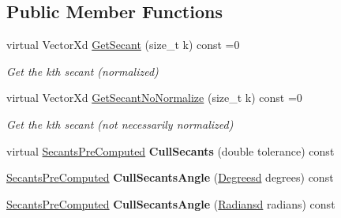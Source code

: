 \subsection*{Public Member Functions}
\begin{DoxyCompactItemize}
\item 
\hypertarget{struct_d_r_d_s_p_1_1_secants_aa36f3ff75b75d498e585cbac447cede9}{virtual Vector\-Xd \hyperlink{struct_d_r_d_s_p_1_1_secants_aa36f3ff75b75d498e585cbac447cede9}{Get\-Secant} (size\-\_\-t k) const =0}\label{struct_d_r_d_s_p_1_1_secants_aa36f3ff75b75d498e585cbac447cede9}

\begin{DoxyCompactList}\small\item\em Get the kth secant (normalized) \end{DoxyCompactList}\item 
\hypertarget{struct_d_r_d_s_p_1_1_secants_a96e9a725643c31456df79a797f427981}{virtual Vector\-Xd \hyperlink{struct_d_r_d_s_p_1_1_secants_a96e9a725643c31456df79a797f427981}{Get\-Secant\-No\-Normalize} (size\-\_\-t k) const =0}\label{struct_d_r_d_s_p_1_1_secants_a96e9a725643c31456df79a797f427981}

\begin{DoxyCompactList}\small\item\em Get the kth secant (not necessarily normalized) \end{DoxyCompactList}\item 
\hypertarget{struct_d_r_d_s_p_1_1_secants_a9b6763bc1541a775e842e437448200ef}{virtual \hyperlink{struct_d_r_d_s_p_1_1_secants_pre_computed}{Secants\-Pre\-Computed} {\bfseries Cull\-Secants} (double tolerance) const }\label{struct_d_r_d_s_p_1_1_secants_a9b6763bc1541a775e842e437448200ef}

\item 
\hypertarget{struct_d_r_d_s_p_1_1_secants_a0f71a6f8d4486035762d783f42ebae99}{\hyperlink{struct_d_r_d_s_p_1_1_secants_pre_computed}{Secants\-Pre\-Computed} {\bfseries Cull\-Secants\-Angle} (\hyperlink{struct_d_r_d_s_p_1_1_degrees}{Degreesd} degrees) const }\label{struct_d_r_d_s_p_1_1_secants_a0f71a6f8d4486035762d783f42ebae99}

\item 
\hypertarget{struct_d_r_d_s_p_1_1_secants_ae86cc8c98ff9ed5ae1f3903b898f9030}{\hyperlink{struct_d_r_d_s_p_1_1_secants_pre_computed}{Secants\-Pre\-Computed} {\bfseries Cull\-Secants\-Angle} (\hyperlink{struct_d_r_d_s_p_1_1_radians}{Radiansd} radians) const }\label{struct_d_r_d_s_p_1_1_secants_ae86cc8c98ff9ed5ae1f3903b898f9030}

\end{DoxyCompactItemize}
